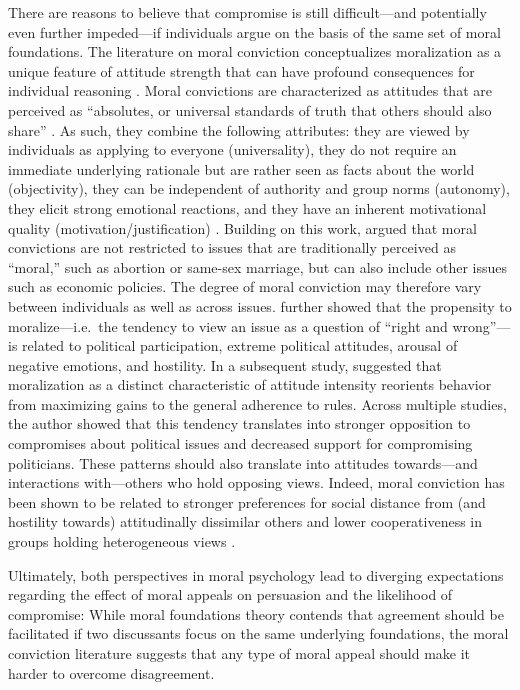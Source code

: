 \documentclass[12pt,]{article}
\begin{document}
There are reasons to believe that compromise is still difficult---and
potentially even further impeded---if individuals argue on the basis of
the same set of moral foundations. The literature on moral conviction
conceptualizes moralization as a unique feature of attitude strength
that can have profound consequences for individual reasoning
\citep{skitka2005moral}. Moral convictions are characterized as
attitudes that are perceived as ``absolutes, or universal standards of
truth that others should also share'' \citep[269]{skitka2010psychology}.
As such, they combine the following attributes: they are viewed by
individuals as applying to everyone (universality), they do not require
an immediate underlying rationale but are rather seen as facts about the
world (objectivity), they can be independent of authority and group
norms (autonomy), they elicit strong emotional reactions, and they have
an inherent motivational quality (motivation/justification)
\citep{skitka2010psychology}. Building on this work,
\citet{ryan2014reconsidering} argued that moral convictions are not
restricted to issues that are traditionally perceived as ``moral,'' such
as abortion or same-sex marriage, but can also include other issues such
as economic policies. The degree of moral conviction may therefore vary
between individuals as well as across issues.
\citet{ryan2014reconsidering} further showed that the propensity to
moralize---i.e.~the tendency to view an issue as a question of ``right
and wrong''---is related to political participation, extreme political
attitudes, arousal of negative emotions, and hostility. In a subsequent
study, \citet{ryan2016no} suggested that moralization as a distinct
characteristic of attitude intensity reorients behavior from maximizing
gains to the general adherence to rules. Across multiple studies, the
author showed that this tendency translates into stronger opposition to
compromises about political issues and decreased support for
compromising politicians. These patterns should also translate into
attitudes towards---and interactions with---others who hold opposing
views. Indeed, moral conviction has been shown to be related to stronger
preferences for social distance from (and hostility towards)
attitudinally dissimilar others and lower cooperativeness in groups
holding heterogeneous views \citep{skitka2005moral}.

Ultimately, both perspectives in moral psychology lead to diverging
expectations regarding the effect of moral appeals on persuasion and the
likelihood of compromise: While moral foundations theory contends that
agreement should be facilitated if two discussants focus on the same
underlying foundations, the moral conviction literature suggests that
any type of moral appeal should make it harder to overcome disagreement.
\end{document}
